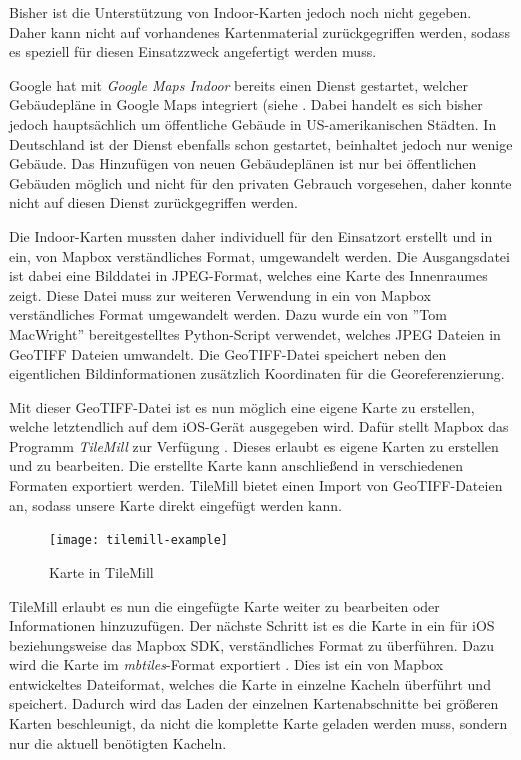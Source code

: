 Bisher ist die Unterstützung von Indoor-Karten jedoch noch nicht gegeben. Daher kann nicht auf vorhandenes Kartenmaterial zurückgegriffen werden, sodass es speziell für diesen Einsatzzweck angefertigt werden muss.

Google hat mit \emph{Google Maps Indoor} bereits einen Dienst gestartet, welcher Gebäudepläne in Google Maps integriert (siehe \cite{googleindoormaps}. Dabei handelt es sich bisher jedoch hauptsächlich um öffentliche Gebäude in US-amerikanischen Städten. In Deutschland ist der Dienst ebenfalls schon gestartet, beinhaltet jedoch nur wenige Gebäude. Das Hinzufügen von neuen Gebäudeplänen ist nur bei öffentlichen Gebäuden möglich und nicht für den privaten Gebrauch vorgesehen, daher konnte nicht auf diesen Dienst zurückgegriffen werden.

Die Indoor-Karten mussten daher individuell für den Einsatzort erstellt und in ein, von Mapbox verständliches Format, umgewandelt werden.
Die Ausgangsdatei ist dabei eine Bilddatei in JPEG-Format, welches eine Karte des Innenraumes zeigt. Diese Datei muss zur weiteren Verwendung in ein von Mapbox verständliches Format umgewandelt werden. 
Dazu wurde ein von ''Tom MacWright'' \cite{jpgtogeo} bereitgestelltes Python-Script verwendet, welches JPEG Dateien in GeoTIFF Dateien umwandelt. Die GeoTIFF-Datei \cite{geotiff} speichert neben den eigentlichen Bildinformationen zusätzlich Koordinaten für die Georeferenzierung. 

Mit dieser GeoTIFF-Datei ist es nun möglich eine eigene Karte zu erstellen, welche letztendlich auf dem iOS-Gerät ausgegeben wird.
Dafür stellt Mapbox das Programm \emph{TileMill} zur Verfügung \cite{tilemill}. Dieses erlaubt es eigene Karten zu erstellen und zu bearbeiten. Die erstellte Karte kann anschließend in verschiedenen Formaten exportiert werden. 
TileMill bietet einen Import von GeoTIFF-Dateien an, sodass unsere Karte direkt eingefügt werden kann.

\begin{figure}[htb!]
	\centering
	\texttt{[image: tilemill-example]}
	\caption{Karte in TileMill}
	\label{tilemill-example}
\end{figure}

TileMill erlaubt es nun die eingefügte Karte weiter zu bearbeiten oder Informationen hinzuzufügen.
Der nächste Schritt ist es die Karte in ein für iOS beziehungsweise das Mapbox SDK, verständliches Format zu überführen.
Dazu wird die Karte im \emph{mbtiles}-Format exportiert \cite{mbtiles}. Dies ist ein von Mapbox entwickeltes Dateiformat, welches die Karte in einzelne Kacheln überführt und speichert. Dadurch wird das Laden der einzelnen Kartenabschnitte bei größeren Karten beschleunigt, da nicht die komplette Karte geladen werden muss, sondern nur die aktuell benötigten Kacheln.

